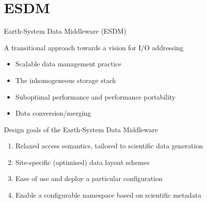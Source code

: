 \documentclass[compress,11pt,xcolor=svgnames,aspectratio=169]{beamer}
\begin{document}
\acknowledgement

\appendix

\begin{frame}[fragile]{}

{ \huge \color{EsiBlue}{Appendix}}

\end{frame}

\section{ESDM}

\begin{frame}[fragile]{Earth-System Data Middleware (ESDM)}

\begin{block}{A transitional approach towards a vision for I/O addressing}
\begin{itemize}
\setlength\itemsep{0.1cm}
  \item Scalable data management practice
  \item The inhomogeneous storage stack
  \item Suboptimal performance and performance portability
  \item Data conversion/merging
\end{itemize}
\end{block}

\begin{block}{Design goals of the Earth-System Data Middleware}
\begin{enumerate}
\setlength\itemsep{0.1cm}
  \item Relaxed access semantics, tailored to scientific data generation
  \item Site-specific (optimised) data layout schemes
  \item Ease of use and deploy a particular configuration
  \item Enable a configurable namespace based on scientific metadata
\end{enumerate}
\end{block}

\end{frame}
\end{document}
